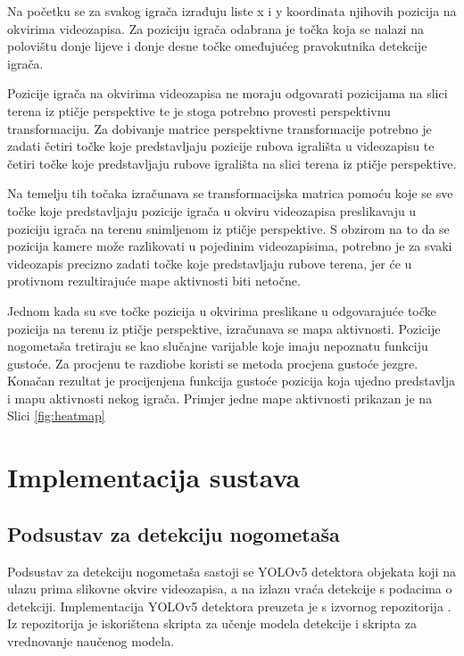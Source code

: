 \documentclass[times, utf8, seminar, numeric]{fer}
\begin{document}
Na početku se za svakog igrača izrađuju liste x i y koordinata njihovih pozicija na okvirima videozapisa. 
Za poziciju igrača odabrana je točka koja se nalazi na polovištu donje lijeve i donje desne točke omeđujućeg pravokutnika detekcije igrača.

Pozicije igrača na okvirima videozapisa ne moraju odgovarati pozicijama na slici terena iz ptičje perspektive te je stoga potrebno provesti perspektivnu transformaciju.  
Za dobivanje matrice perspektivne transformacije potrebno je zadati četiri točke koje predstavljaju pozicije rubova igrališta u videozapisu te četiri točke koje predstavljaju rubove igrališta na slici terena iz ptičje perspektive. 

Na temelju tih točaka izračunava se transformacijska matrica pomoću koje se sve točke koje predstavljaju pozicije igrača u okviru videozapisa preslikavaju u poziciju igrača na terenu snimljenom iz ptičje perspektive. S obzirom na to da se pozicija kamere može razlikovati u pojedinim videozapisima, potrebno je za svaki videozapis precizno zadati točke koje predstavljaju rubove terena, jer će u protivnom rezultirajuće mape aktivnosti biti netočne.

Jednom kada su sve točke pozicija u okvirima preslikane u odgovarajuće točke pozicija na terenu iz ptičje perspektive, izračunava se mapa aktivnosti. Pozicije nogometaša tretiraju se kao slučajne varijable koje imaju nepoznatu funkciju gustoće. Za procjenu te razdiobe koristi se metoda procjena gustoće jezgre. Konačan rezultat je procijenjena funkcija gustoće pozicija koja ujedno predstavlja i mapu aktivnosti nekog igrača. Primjer jedne mape aktivnosti prikazan je na Slici \ref{fig:heatmap}




\chapter{Implementacija sustava}

\section{Podsustav za detekciju nogometaša}


Podsustav za detekciju nogometaša sastoji se YOLOv5 detektora objekata koji na ulazu prima slikovne okvire videozapisa, a na izlazu vraća detekcije s podacima o detekciji. 
Implementacija YOLOv5 detektora preuzeta je s izvornog repozitorija \cite{yolov5impl}. Iz repozitorija je iskorištena skripta za učenje modela detekcije i skripta za vrednovanje naučenog modela. 
\end{document}
